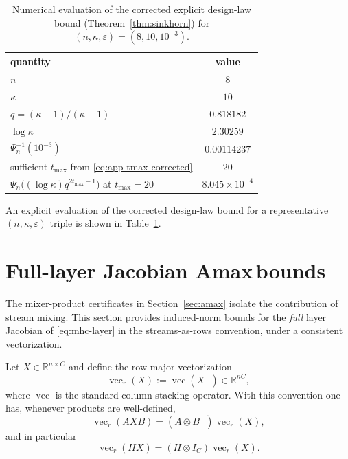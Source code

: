 \documentclass[11pt]{article}
\numberwithin{equation}{section}
\theoremstyle{plain}
\theoremstyle{definition}
\theoremstyle{remark}
\newcommand{\R}{\mathbb{R}}
\newcommand{\vecop}{\operatorname{vec}}
\newcommand{\Amax}{\textsf{Amax}\,}
\begin{document}
\begin{table}[tbp]
\centering
\small
\begin{tabular}{@{}l c@{}}
\toprule
quantity & value \\
\midrule
$n$ & $8$ \\
$\kappa$ & $10$ \\
$q=(\kappa-1)/(\kappa+1)$ & $0.818182$ \\
$\log\kappa$ & $2.30259$ \\
$\Psi_n^{-1}(10^{-3})$ & $0.00114237$ \\
sufficient $t_{\max}$ from \eqref{eq:app-tmax-corrected} & $20$ \\
$\Psi_n\!\big((\log\kappa)q^{2t_{\max}-1}\big)$ at $t_{\max}=20$ & $8.045\times 10^{-4}$ \\
\bottomrule
\end{tabular}
\caption{Numerical evaluation of the corrected explicit design-law bound (Theorem~\ref{thm:sinkhorn}) for $(n,\kappa,\bar\varepsilon)=(8,10,10^{-3})$.}
\label{tab:explicit_bound_example}
\end{table}

An explicit evaluation of the corrected design-law bound for a representative $(n,\kappa,\bar\varepsilon)$ triple is shown in Table~\ref{tab:explicit_bound_example}.


\section{Full-layer Jacobian \Amax bounds}\label{app:jacobian}

The mixer-product certificates in Section~\ref{sec:amax} isolate the contribution of stream mixing.
This section provides induced-norm bounds for the \emph{full} layer Jacobian of \eqref{eq:mhc-layer} in the streams-as-rows convention, under a consistent vectorization.
 


 
Let $X\in\R^{n\times C}$ and define the row-major vectorization
\begin{equation}
\vecop_r(X):=\vecop(X^\top)\in\R^{nC},
\end{equation}
where $\vecop$ is the standard column-stacking operator.
With this convention one has, whenever products are well-defined,
\begin{equation}\label{eq:rvec-axb}
\vecop_r(AXB)=(A\otimes B^\top)\vecop_r(X),
\end{equation}
and in particular
\begin{equation}\label{eq:rvec-hx}
\vecop_r(HX)=(H\otimes I_C)\vecop_r(X).
\end{equation}
\end{document}
